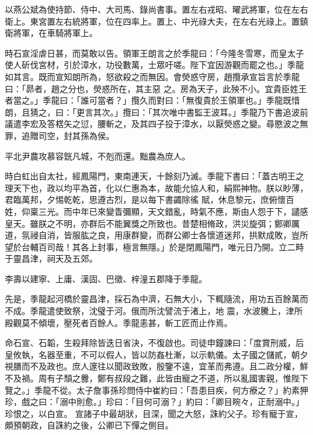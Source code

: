 \begin{pinyinscope}
 以燕公斌為使持節、侍中、大司馬、錄尚書事。置左右戎昭、曜武將軍，位在左右衛上。東宮置左右統將軍，位在四率上。置上、中光祿大夫，在左右光祿上。置鎮衛將軍，在車騎將軍上。



 時石宣淫虐日甚，而莫敢以告。領軍王朗言之於季龍曰：「今隆冬雪寒，而皇太子使人斫伐宮材，引於漳水，功役數萬，士眾吁嗟。陛下宜因游觀而罷之也。」季龍如其言。既而宣知朗所為，怒欲殺之而無因。會熒惑守房，趙攬承宣旨言於季龍曰：「昴者，趙之分也，熒惑所在，其主惡
 之。房為天子，此殃不小。宜貴臣姓王者當之。」季龍曰：「誰可當者？」攬久而對曰：「無復貴於王領軍也。」季龍既惜朗，且猜之，曰：「更言其次。」攬曰：「其次唯中書監王波耳。」季龍乃下書追波前議遣李宏及答楛矢之愆，腰斬之，及其四子投于漳水，以厭熒惑之變。尋愍波之無罪，追贈司空，封其孫為侯。



 平北尹農攻慕容皝凡城，不剋而還。黜農為庶人。



 時白虹出自太社，經鳳陽門，東南連天，十餘刻乃滅。季龍下書曰：「蓋古明王之理天下也，政以均平為首，化以仁惠為本，故能允協人和，絹熙神物。朕以眇薄，君臨萬邦，夕惕乾乾，思遵古烈，是以每下書蠲除徭
 賦，休息黎元，庶俯懷百姓，仰稟三光。而中年已來變眚彌顯，天文錯亂，時氣不應，斯由人怨于下，譴感皇天。雖朕之不明，亦群后不能翼獎之所致也。昔楚相脩政，洪災旋弭；鄭卿厲道，氛祲自消，皆服肱之良，用康群變，而群公卿士各懷道迷邦，拱默成敗，豈所望於台輔百司哉！其各上封事，極言無隱。」於是閉鳳陽門，唯元日乃開。立二畤于靈昌津，祠天及五郊。



 李壽以建寧、上庸、漢固、巴徵、梓潼五郡降于季龍。



 先是，季龍起河橋於靈昌津，採石為中濟，石無大小，下輒隨流，用功五百餘萬而不成。季龍遣使致祭，沈璧于河。俄而所沈譬流于渚上，地
 震，水波騰上，津所殿觀莫不傾壞，壓死者百餘人。季龍恚甚，斬工匠而止作焉。



 命石宣、石韜，生殺拜除皆迭日省決，不復啟也。司徒申鐘諫曰：「度賞刑威，后皇攸執，名器至重，不可以假人，皆以防姦杜漸，以示軌儀。太子國之儲貳，朝夕視膳而不及政也。庶人邃往以聞政致敗，殷鑒不遠，宜革而弗遵。且二政分權，鮮不及禍。周有子頹之釁，鄭有叔段之難，此皆由寵之不道，所以亂國害親，惟陛下覽之。」季龍不從。太子詹事孫珍問侍中崔約曰：「吾患目疾，何方療之？」約素狎珍，戲之曰：「溺中則愈。」珍曰：「目何可溺？」約曰：「卿目睕々，正耐溺中。」珍恨之，以白宣。
 宣諸子中最胡狀，目深，聞之大怒，誅約父子。珍有寵于宣，頗預朝政，自誅約之後，公卿已下憚之側目。




\end{pinyinscope}
